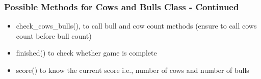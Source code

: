 \documentclass[14pt]{beamer}
\begin{document}
    \begin{frame}[containsverbatim]
        \frametitle{Possible Methods for Cows and Bulls Class - Continued}
        \begin{itemize}
        \item check\_cows\_bulls(), to call bull and cow count methods (ensure to call cows count before bull count)
        \item finished() to check whether game is complete
        \item score() to know the current score i.e., number of cows and number of bulls
        \end{itemize}
    \end{frame}
\end{document}
